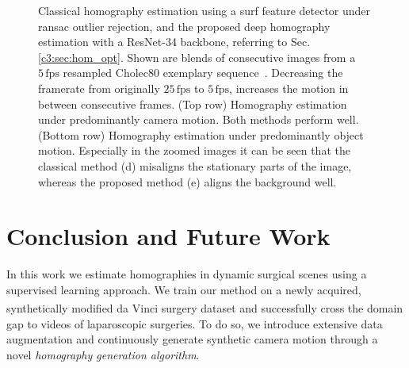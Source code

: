 \begin{figure}[tb]
    \caption{Classical homography estimation using a \gls{surf} feature detector under \gls{ransac} outlier rejection, and the proposed deep homography estimation with a ResNet-34 backbone, referring to Sec.\,\ref{c3:sec:hom_opt}. Shown are blends of consecutive images from a $5\,\text{fps}$ resampled Cholec80 exemplary sequence~\cite{twinanda2016endonet}. Decreasing the framerate from originally $25\,\text{fps}$ to $5\,\text{fps}$, increases the motion in between consecutive frames. (Top row) Homography estimation under predominantly camera motion. Both methods perform well. (Bottom row) Homography estimation under predominantly object motion. Especially in the zoomed images it can be seen that the classical method (d) misaligns the stationary parts of the image, whereas the proposed method (e) aligns the background well.}
    \label{c3:fig:qualitative}
\end{figure}



\section{Conclusion and Future Work}

In this work we estimate homographies in dynamic surgical scenes using a supervised learning approach. We train our method on a newly acquired, synthetically modified da Vinci\textsuperscript{\textregistered} surgery dataset and successfully cross the domain gap to videos of laparoscopic surgeries. To do so, we introduce extensive data augmentation and continuously generate synthetic camera motion through a novel \textit{homography generation algorithm}.

